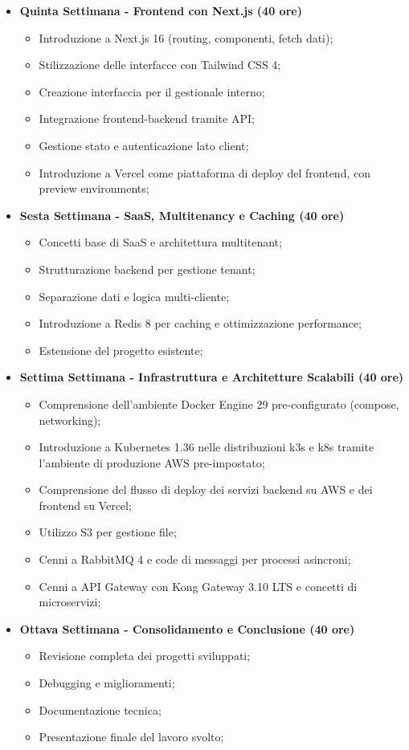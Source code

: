 {\begin{itemize}
\item \textbf{Quinta Settimana - Frontend con Next.js (40 ore)}
\begin{itemize}
    \item Introduzione a Next.js 16 (routing, componenti, fetch dati);
    \item Stilizzazione delle interfacce con Tailwind CSS 4;
    \item Creazione interfaccia per il gestionale interno;
    \item Integrazione frontend-backend tramite API;
    \item Gestione stato e autenticazione lato client;
    \item Introduzione a Vercel come piattaforma di deploy del frontend, con preview environments;
\end{itemize}

\item \textbf{Sesta Settimana - SaaS, Multitenancy e Caching (40 ore)}
\begin{itemize}
    \item Concetti base di SaaS e architettura multitenant;
    \item Strutturazione backend per gestione tenant;
    \item Separazione dati e logica multi-cliente;
    \item Introduzione a Redis 8 per caching e ottimizzazione performance;
    \item Estensione del progetto esistente;
\end{itemize}

\item \textbf{Settima Settimana - Infrastruttura e Architetture Scalabili (40 ore)}
\begin{itemize}
    \item Comprensione dell'ambiente Docker Engine 29 pre-configurato (compose, networking);
    \item Introduzione a Kubernetes 1.36 nelle distribuzioni k3s e k8s tramite l'ambiente di produzione AWS pre-impostato;
    \item Comprensione del flusso di deploy dei servizi backend su AWS e dei frontend su Vercel;
    \item Utilizzo S3 per gestione file;
    \item Cenni a RabbitMQ 4 e code di messaggi per processi asincroni;
    \item Cenni a API Gateway con Kong Gateway 3.10 LTS e concetti di microservizi;
\end{itemize}

\item \textbf{Ottava Settimana - Consolidamento e Conclusione (40 ore)}
\begin{itemize}
    \item Revisione completa dei progetti sviluppati;
    \item Debugging e miglioramenti;
    \item Documentazione tecnica;
    \item Presentazione finale del lavoro svolto;
\end{itemize}

\end{itemize}
}

